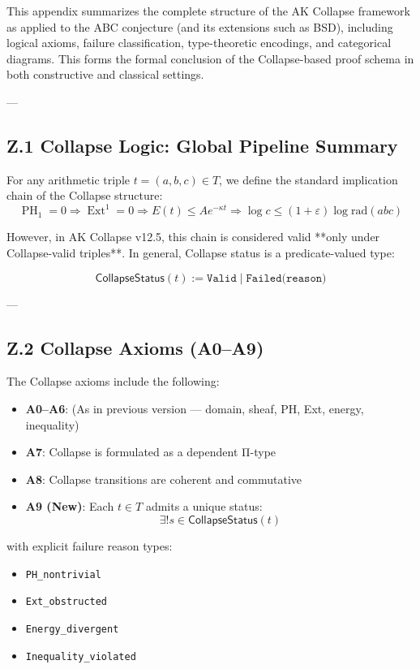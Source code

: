 \documentclass[11pt]{article}
\DeclareMathOperator{\Ext}{Ext}
\DeclareMathOperator{\PH}{PH}
\begin{document}
This appendix summarizes the complete structure of the AK Collapse framework as applied to the ABC conjecture  
(and its extensions such as BSD), including logical axioms, failure classification, type-theoretic encodings, and categorical diagrams.  
This forms the formal conclusion of the Collapse-based proof schema in both constructive and classical settings.

---

\subsection*{Z.1 Collapse Logic: Global Pipeline Summary}

For any arithmetic triple \( t = (a,b,c) \in T \), we define the standard implication chain of the Collapse structure:
\[
\boxed{
\PH_1 = 0 \Rightarrow \Ext^1 = 0 \Rightarrow E(t) \leq Ae^{-\kappa t} \Rightarrow \log c \leq (1+\varepsilon)\log \mathrm{rad}(abc)
}
\]

However, in AK Collapse v12.5, this chain is considered valid **only under Collapse-valid triples**.  
In general, Collapse status is a predicate-valued type:

\[
\mathsf{CollapseStatus}(t) := \texttt{Valid} \;|\; \texttt{Failed(reason)}
\]

---

\subsection*{Z.2 Collapse Axioms (A0–A9)}

The Collapse axioms include the following:

\begin{itemize}
  \item \textbf{A0–A6}: (As in previous version — domain, sheaf, PH, Ext, energy, inequality)
  \item \textbf{A7}: Collapse is formulated as a dependent Π-type
  \item \textbf{A8}: Collapse transitions are coherent and commutative
  \item \textbf{A9 (New)}: Each \( t \in T \) admits a unique status:  
  \[
  \exists! s \in \mathsf{CollapseStatus}(t)
  \]
\end{itemize}
  
with explicit failure reason types:  
\begin{itemize}
  \item[] \texttt{PH\_nontrivial}
  \item[] \texttt{Ext\_obstructed}
  \item[] \texttt{Energy\_divergent}
  \item[] \texttt{Inequality\_violated}
\end{itemize}
\end{document}
